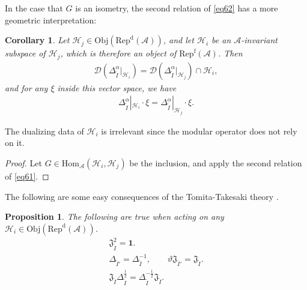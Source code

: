 \documentclass[12pt,a4paper]{article}
\theoremstyle{definition}
\theoremstyle{plain}
\newtheorem{pp}[df]{Proposition}
\newtheorem{co}[df]{Corollary}
\newcommand{\fk}{\mathfrak}
\newcommand{\mc}{\mathcal}
\newcommand{\wtd}{\widetilde}
\newcommand{\id}{\mathbf{1}}
\newcommand{\Hom}{\mathrm{Hom}}
\newcommand{\Dom}{\scr D}
\newcommand{\scr}{\mathscr}
\newcommand{\RepdA}{\mathrm{Rep}^{\mathrm d}(\mc A)}
\newcommand{\RepfA}{\mathrm{Rep}^{\mathrm f}(\mc A)}
\newcommand{\Obj}{\mathrm{Obj}}
\numberwithin{equation}{section}
\begin{document}
In the case that $G$ is an isometry, the second relation of \eqref{eq62} has a more geometric interpretation:

\begin{co}
Let $\mc H_j\in\Obj(\RepdA)$, and let $\mc H_i$ be an $\mc A$-invariant subspace of $\mc H_j$, which is therefore an object of $\RepfA$. Then
\begin{align*}
\Dom(\Delta_{\wtd I}^\alpha|_{\mc H_i})=\Dom(\Delta_{\wtd I}^\alpha|_{\mc H_j})\cap\mc H_i,
\end{align*}
and for any $\xi$ inside this vector space, we have
\begin{align*}
\Delta_{\wtd I}^\alpha|_{\mc H_i}\cdot \xi=	\Delta_{\wtd I}^\alpha|_{\mc H_j}\cdot \xi.
\end{align*}
\end{co}

The dualizing data of $\mc H_i$ is irrelevant since the modular operator does not rely on it.

\begin{proof}
Let $G\in\Hom_{\mc A}(\mc H_i,\mc H_j)$ be the inclusion, and apply the second relation of \eqref{eq61}.
\end{proof}

The following are some easy consequences of the Tomita-Takesaki theory \cite[Chapter VI]{Tak02}.

\begin{pp}\label{lb25}
The following are true when acting on any $\mc H_i\in\Obj(\RepdA)$.
\begin{gather}
\fk J_{\wtd I}^2=\id.\label{eq22}\\
\Delta_{\wtd I'}=\Delta_{\wtd I}^{-1},\qquad\vartheta\fk J_{\wtd I'}=\fk J_{\wtd I}.\label{eq23}\\
\fk J_{\wtd I}\Delta_{\wtd I}^{\frac 12}=\Delta_{\wtd I}^{-\frac 12}\fk J_{\wtd I}.\label{eq24}
\end{gather}
\end{pp}
\end{document}
